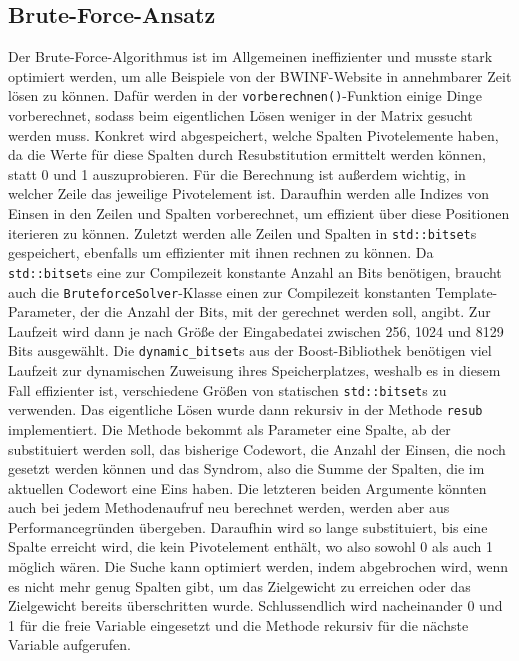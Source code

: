 \documentclass[a4paper,10pt,ngerman]{scrartcl}
\begin{document}
\subsection{Brute-Force-Ansatz}
Der Brute-Force-Algorithmus ist im Allgemeinen ineffizienter und musste stark optimiert werden, um alle Beispiele von der BWINF-Website in annehmbarer Zeit lösen zu können. 
Dafür werden in der \lstinline{vorberechnen()}-Funktion einige Dinge vorberechnet, sodass beim eigentlichen Lösen weniger in der Matrix gesucht werden muss. 
Konkret wird abgespeichert, welche Spalten Pivotelemente haben, da die Werte für diese Spalten durch Resubstitution ermittelt werden können, statt 0 und 1 auszuprobieren. 
Für die Berechnung ist außerdem wichtig, in welcher Zeile das jeweilige Pivotelement ist. 
Daraufhin werden alle Indizes von Einsen in den Zeilen und Spalten vorberechnet, um effizient über diese Positionen iterieren zu können. 
Zuletzt werden alle Zeilen und Spalten in \lstinline{std::bitset}s gespeichert, ebenfalls um effizienter mit ihnen rechnen zu können.
Da \lstinline{std::bitset}s eine zur Compilezeit konstante Anzahl an Bits benötigen, braucht auch die \lstinline{BruteforceSolver}-Klasse einen zur Compilezeit konstanten Template-Parameter, der die Anzahl der Bits, mit der gerechnet werden soll, angibt.  
Zur Laufzeit wird dann je nach Größe der Eingabedatei zwischen 256, 1024 und 8129 Bits ausgewählt. 
Die \lstinline{dynamic_bitset}s aus der Boost-Bibliothek benötigen viel Laufzeit zur dynamischen Zuweisung ihres Speicherplatzes, weshalb es in diesem Fall effizienter ist, verschiedene Größen von statischen \lstinline{std::bitset}s zu verwenden.
Das eigentliche Lösen wurde dann rekursiv in der Methode \lstinline{resub} implementiert.
Die Methode bekommt als Parameter eine Spalte, ab der substituiert werden soll, das bisherige Codewort, die Anzahl der Einsen, die noch gesetzt werden können und das Syndrom, also die Summe der Spalten, die im aktuellen Codewort eine Eins haben. 
Die letzteren beiden Argumente könnten auch bei jedem Methodenaufruf neu berechnet werden, werden aber aus Performancegründen übergeben. 
Daraufhin wird so lange substituiert, bis eine Spalte erreicht wird, die kein Pivotelement enthält, wo also sowohl 0 als auch 1 möglich wären.
Die Suche kann optimiert werden, indem abgebrochen wird, wenn es nicht mehr genug Spalten gibt, um das Zielgewicht zu erreichen oder das Zielgewicht bereits überschritten wurde. 
Schlussendlich wird nacheinander 0 und 1 für die freie Variable eingesetzt und die Methode rekursiv für die nächste Variable aufgerufen. 
\end{document}

